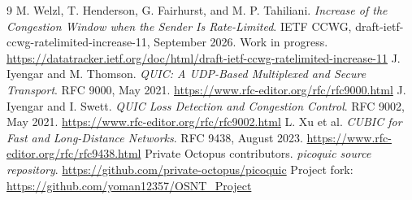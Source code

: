 \begin{thebibliography}{9}
 M. Welzl, T. Henderson, G. Fairhurst, and M. P. Tahiliani.
\emph{Increase of the Congestion Window when the Sender Is Rate-Limited}.
IETF CCWG, draft-ietf-ccwg-ratelimited-increase-11, September 2026.
Work in progress. \url{https://datatracker.ietf.org/doc/html/draft-ietf-ccwg-ratelimited-increase-11}
 J. Iyengar and M. Thomson. \emph{QUIC: A UDP-Based Multiplexed
and Secure Transport}. RFC 9000, May 2021.
\url{https://www.rfc-editor.org/rfc/rfc9000.html}
 J. Iyengar and I. Swett. \emph{QUIC Loss Detection and
Congestion Control}. RFC 9002, May 2021.
\url{https://www.rfc-editor.org/rfc/rfc9002.html}
 L. Xu et al. \emph{CUBIC for Fast and Long-Distance Networks}.
RFC 9438, August 2023. \url{https://www.rfc-editor.org/rfc/rfc9438.html}
 Private Octopus contributors. \emph{picoquic source repository}.
\url{https://github.com/private-octopus/picoquic}
Project fork: \url{https://github.com/yoman12357/OSNT_Project}
\end{thebibliography}
